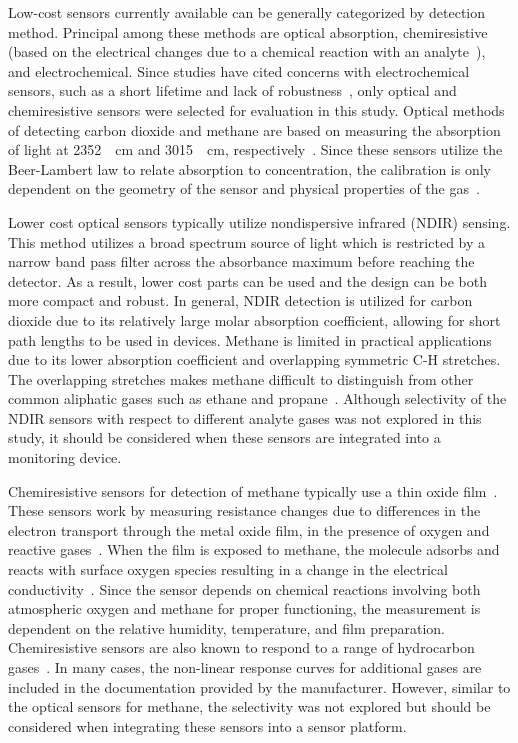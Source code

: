 \documentclass[preprint,sort&compress]{elsarticle}
\begin{document}
		Low-cost sensors currently available can be generally categorized by detection method.
		Principal among these methods are optical absorption, chemiresistive (based on the electrical changes due to a chemical reaction with an analyte~\cite{wetchakun_semiconducting_2011}), and electrochemical.
		Since studies have cited concerns with electrochemical sensors, such as a short lifetime and lack of robustness~\cite{neri_first_2015}, only optical and chemiresistive sensors were selected for evaluation in this study.
		Optical methods of detecting carbon dioxide and methane are based on measuring the absorption of light at \SI{2352}{\per\centi\meter} and \SI{3015}{\per\centi\meter}, respectively~\cite{frodl_high-precision_2006,zhu_one_2012}.
		Since these sensors utilize the Beer-Lambert law to relate absorption to concentration, the calibration is only dependent on the geometry of the sensor and physical properties of the gas~\cite{bacsik_ftir_2004}.
		
		Lower cost optical sensors typically utilize nondispersive infrared (NDIR) sensing.
		This method utilizes a broad spectrum source of light which is restricted by a narrow band pass filter across the absorbance maximum before reaching the detector.
		As a result, lower cost parts can be used and the design can be both more compact and robust.
		In general, NDIR detection is utilized for carbon dioxide due to its relatively large molar absorption coefficient, allowing for short path lengths to be used in devices.
		Methane is limited in practical applications due to its lower absorption coefficient and overlapping symmetric C-H stretches.
		The overlapping stretches makes methane difficult to distinguish from other common aliphatic gases such as ethane and propane~\cite{coblentz_society_inc._evaluated_????}.
		Although selectivity of the NDIR sensors with respect to different analyte gases was not explored in this study, it should be considered when these sensors are integrated into a monitoring device. 
		
		Chemiresistive sensors for detection of methane typically use a thin oxide film~\cite{neri_first_2015}.
		These sensors work by measuring resistance changes due to differences in the electron transport through the metal oxide film, in the presence of oxygen and reactive gases~\cite{albert_cross-reactive_2000}.
		When the film is exposed to methane, the molecule adsorbs and reacts with surface oxygen species resulting in a change in the electrical conductivity~\cite{wang_metal_2010,prudenziati_thick-film_1986}.
		Since the sensor depends on chemical reactions involving both atmospheric oxygen and methane for proper functioning, the measurement is dependent on the relative humidity, temperature, and film preparation.
		Chemiresistive sensors are also known to respond to a range of hydrocarbon gases~\cite{sekhar_development_2016}. In many cases, the non-linear response curves for additional gases are included in the documentation provided by the manufacturer.
		However, similar to the optical sensors for methane, the selectivity was not explored but should be considered when integrating these sensors into a sensor platform.
		
\end{document}
